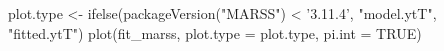 \begin{Schunk}
\begin{Sinput}
 plot.type <- ifelse(packageVersion("MARSS") < '3.11.4', "model.ytT", "fitted.ytT")
 plot(fit_marss, plot.type = plot.type, pi.int = TRUE)
\end{Sinput}
\end{Schunk}
